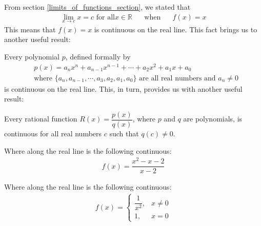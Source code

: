 \begin{recall}
From section \ref{limits_of_functions_section}, we stated that 
\begin{align*}
    \lim_{x \longrightarrow c} x = c \hspace{4pt} \text{for all} x \in \mathbb{R} \hspace{20pt} \text{when} \hspace{20pt} f(x) = x 
\end{align*}
This means that $f(x) = x$ is continuous on the real line. This fact brings us to another useful result:
\end{recall}

\begin{theorem}
Every polynomial $p$, defined formally by
\begin{align*}
    &p(x) = a_{n}x^{n} + a_{n-1}x^{n-1} + \cdots + a_{2}x^{2} + a_{1}x + a_{0}\\[2ex]
    &\text{where} \hspace{4pt} \{a_{n}, a_{n-1}, \cdots , a_{3}, a_{2}, a_{1}, a_{0}\} \hspace{4pt} \text{are all real numbers and} \hspace{4pt} a_{n} \neq 0
\end{align*}
is continuous on the real line. This, in turn, provides us with another useful result:
\end{theorem}

\begin{theorem}
Every rational function $R(x)=\dfrac{p(x)}{q(x)}$, where $p$ and $q$ are polynomials, is continuous for all real numbers $c$ such that $q(c) \neq 0$.
\end{theorem}

\begin{exercise}
Where along the real line is the following continuous:
\begin{align*}
    f(x) = \dfrac{x^{2}-x-2}{x-2}
\end{align*}
\end{exercise}

\begin{exercise}
Where along the real line is the following continuous:
\begin{align*}
    f(x) =
    \begin{cases}
    \dfrac{1}{x^{2}}, &x \neq 0\\
    1, &x = 0
    \end{cases}
\end{align*}
\end{exercise}

